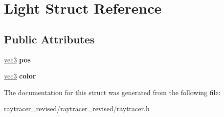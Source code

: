 \hypertarget{struct_light}{
\section{Light Struct Reference}
\label{struct_light}
}
\subsection*{Public Attributes}
\begin{DoxyCompactItemize}
\item 
\hypertarget{struct_light_a1ddc9cb0f845afbfd480f890f89aea17}{
\hyperlink{classvec3}{vec3} {\bfseries pos}}
\label{struct_light_a1ddc9cb0f845afbfd480f890f89aea17}

\item 
\hypertarget{struct_light_a4de55f2ffad274ae9f37045d975125a4}{
\hyperlink{classvec3}{vec3} {\bfseries color}}
\label{struct_light_a4de55f2ffad274ae9f37045d975125a4}

\end{DoxyCompactItemize}


The documentation for this struct was generated from the following file:\begin{DoxyCompactItemize}
\item 
raytracer\_\-revised/raytracer\_\-revised/raytracer.h\end{DoxyCompactItemize}
